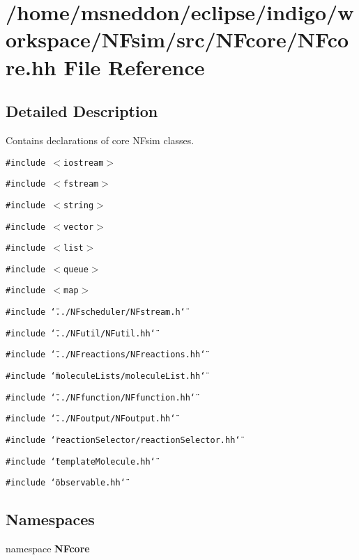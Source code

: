 \section{/home/msneddon/eclipse/indigo/workspace/NFsim/src/NFcore/NFcore.hh File Reference}
\label{NFcore_8hh}


\subsection{Detailed Description}
Contains declarations of core NFsim classes. 



{\tt \#include $<$iostream$>$}\par
{\tt \#include $<$fstream$>$}\par
{\tt \#include $<$string$>$}\par
{\tt \#include $<$vector$>$}\par
{\tt \#include $<$list$>$}\par
{\tt \#include $<$queue$>$}\par
{\tt \#include $<$map$>$}\par
{\tt \#include \char`\"{}../NFscheduler/NFstream.h\char`\"{}}\par
{\tt \#include \char`\"{}../NFutil/NFutil.hh\char`\"{}}\par
{\tt \#include \char`\"{}../NFreactions/NFreactions.hh\char`\"{}}\par
{\tt \#include \char`\"{}moleculeLists/moleculeList.hh\char`\"{}}\par
{\tt \#include \char`\"{}../NFfunction/NFfunction.hh\char`\"{}}\par
{\tt \#include \char`\"{}../NFoutput/NFoutput.hh\char`\"{}}\par
{\tt \#include \char`\"{}reactionSelector/reactionSelector.hh\char`\"{}}\par
{\tt \#include \char`\"{}templateMolecule.hh\char`\"{}}\par
{\tt \#include \char`\"{}observable.hh\char`\"{}}\par
\subsection*{Namespaces}
\begin{CompactItemize}
\item 
namespace {\bf NFcore}
\end{CompactItemize}
